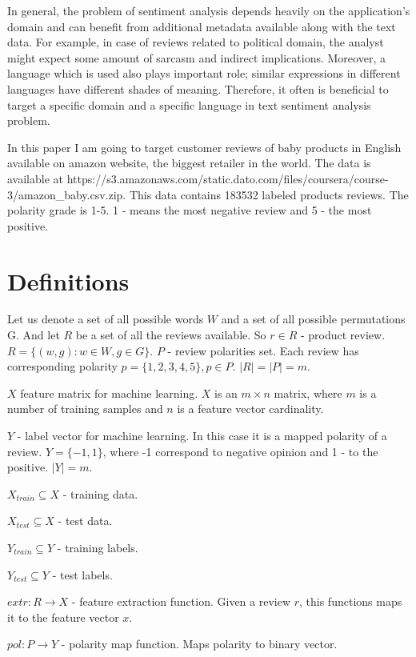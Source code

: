 \documentclass[12pt]{report}
\begin{document}
In general, the problem of sentiment analysis depends heavily on the application's domain and can benefit from additional metadata available along with the text data. For example, in case of reviews related to political domain, the analyst might expect some amount of sarcasm and indirect implications. Moreover, a language which is used also plays important role; similar expressions in different languages have different shades of meaning. Therefore, it often is beneficial to target a specific domain and a specific language in text sentiment analysis problem.

In this paper I am going to target customer reviews of baby products in English available on amazon website, the biggest retailer in the world. The data is available at https://s3.amazonaws.com/static.dato.com/files/coursera/course-3/amazon\_baby.csv.zip.
This data contains 183532 labeled products reviews. The polarity grade is 1-5. 1 - means the most negative review and 5 - the most positive.

\newpage

\section{Definitions}

Let us denote a set of all possible words $W$ and a set of all possible permutations G.
And let $R$ be a set of all the reviews available. So $r \in R$ - product review.
$R = \{(w, g): w \in W, g \in G\}$.
$P$ - review polarities set. Each review has corresponding polarity $p=\{1,2,3,4,5\}, p \in P$.
$|R| = |P| = m$.

$X$ feature matrix for machine learning. $X$ is an $m\times n$ matrix, where $m$ is a number of training samples and $n$ is a feature vector cardinality.

$Y$ - label vector for machine learning. In this case it is a mapped polarity of a review. $Y=\{-1,1\}$, where -1 correspond to negative opinion and 1 - to the positive. $|Y| = m$.

$X_{train} \subseteq X$ - training data.

$X_{test} \subseteq X$ - test data.

$Y_{train} \subseteq Y$ - training labels.

$Y_{test} \subseteq Y$ - test labels.

$extr: R \rightarrow X$ - feature extraction function. Given a review $r$, this functions maps it to the feature vector $x$.

$pol: P \rightarrow Y$ - polarity map function. Maps polarity to binary vector. 
\end{document}
